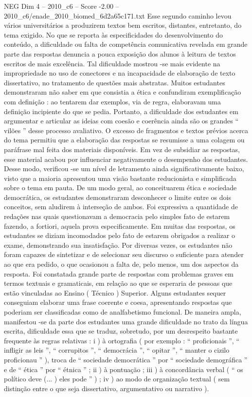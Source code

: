 \begin{textsample}{NEG Dim 4 – 2010\_c6 – Score -2.00 – 2010\_c6/enade\_2010\_biomed\_6d2a65c171.txt}
Esse segundo caminho levou vários universitários a produzirem textos bem escritos, distantes, entretanto, do tema exigido.
No que se reporta às especificidades do desenvolvimento do conteúdo, a dificuldade ou falta de competência comunicativa revelada em grande parte das respostas denuncia a pouca exposição dos alunos à leitura de textos escritos de mais excelência.
Tal dificuldade mostrou -se mais evidente na impropriedade no uso de conectores e na incapacidade de elaboração de texto dissertativo, no tratamento de questões mais abstratas.
Muitos estudantes demonstraram não saber em que consistia a ética e confundiram exemplificação com definição : ao tentarem dar exemplos, via de regra, elaboravam uma definição incipiente do que se pedia.
Portanto, a dificuldade dos estudantes em argumentar e articular as ideias com coesão e coerência ainda são os grandes “ vilões ” desse processo avaliativo.
O excesso de fragmentos e textos prévios acerca do tema permitiu que a elaboração das respostas se resumisse a uma colagem ou paráfrase mal feita dos materiais disponíveis.
Em vez de subsidiar as respostas, esse material acabou por influenciar negativamente o desempenho dos estudantes.
Desse modo, verificou -se um nível de letramento ainda significativamente baixo, visto que a maioria apresentou uma visão bastante reducionista e simplificada sobre o tema em pauta.
De um modo geral, ao conceituarem ética e sociedade democrática, os estudantes demonstraram desconhecer o limite entre os dois conceitos, sem aludirem à interseção de ambos.
Foi expressiva a quantidade de redações nas quais questionavam a democracia pelo simples fato de estarem fazendo, a fortiori, aquela prova especificamente.
Em muitas das respostas, os estudantes se diziam incomodados pelo fato de estarem obrigados a realizar o exame, demonstrando sua insatisfação.
Por diversas vezes, os estudantes não foram capazes de sintetizar e de selecionar seu discurso o suficiente para atender ao que era pedido, o que ocasionou a falta de, pelo menos, um dos aspectos da resposta.
Foi constatada grande parte de respostas com problemas graves em termos textuais e gramaticais, em relação ao que se esperaria de pessoas que estão vinculadas ao Ensino ( Técnico ) Superior.
Alguns estudantes sequer conseguiam elaborar uma frase coerente e coesa, apresentando respostas que poderiam ser classificadas como de analfabetismo funcional.
De maneira ampla, manifestou -se da parte dos estudantes uma grande dificuldade no trato da língua escrita, dificuldade essa que se traduz, sobretudo, por um desrespeito bastante frequente às regras relativas : i ) à ortografia ( por exemplo : “ proficionais ”, “ infligir as leis ”, “ corrupitos ”, “ democrácia ”, “ opitar ”, “ manter o cizilo proficionau ” ), troca de “ sociedade democrática ” por “ sociedade demográfica ” e de “ ética ” por “ étnica ” ; ii ) à pontuação ; iii ) à concordância verbal ( “ os político deve (... ) eles pode ” ) ; iv ) ao modo de organização textual ( sem distinção entre o que seja dissertativo, argumentativo ou narrativo ).

\end{textsample}
